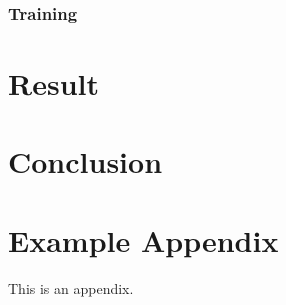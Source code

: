 \documentclass[11pt]{article}
\begin{document}
\subsubsection{Training}

\section{Result}

\section{Conclusion}



\appendix

\section{Example Appendix}
\label{sec:appendix}

This is an appendix.
\end{document}
